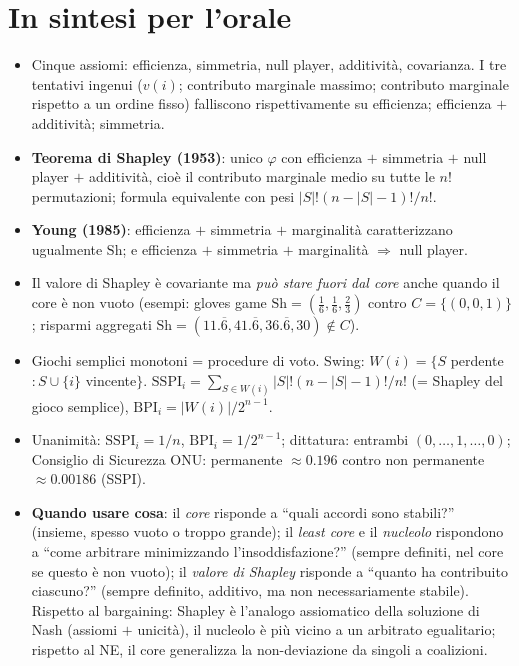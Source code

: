 \documentclass[12pt,a4paper,twoside]{book}
\theoremstyle{plain}
\theoremstyle{definition}
\newcommand{\Sh}{\mathrm{Sh}}
\begin{document}
\section*{In sintesi per l'orale}
\begin{itemize}
  \item Cinque assiomi: efficienza, simmetria, null player, additività,
        covarianza. I tre tentativi ingenui ($v(i)$; contributo marginale massimo;
        contributo marginale rispetto a un ordine fisso) falliscono
        rispettivamente su efficienza; efficienza $+$ additività; simmetria.
  \item \textbf{Teorema di Shapley (1953)}: unico $\varphi$ con efficienza $+$
        simmetria $+$ null player $+$ additività, cioè il contributo marginale
        medio su tutte le $n!$ permutazioni; formula equivalente con pesi
        $|S|!(n-|S|-1)!/n!$.
  \item \textbf{Young (1985)}: efficienza $+$ simmetria $+$ marginalità
        caratterizzano ugualmente $\Sh$; e efficienza $+$ simmetria $+$
        marginalità $\Rightarrow$ null player.
  \item Il valore di Shapley è covariante ma \emph{può stare fuori dal core}
        anche quando il core è non vuoto (esempi: gloves game
        $\Sh=(\tfrac16,\tfrac16,\tfrac23)$ contro $C=\{(0,0,1)\}$; risparmi
        aggregati $\Sh=(11.\overline6,41.\overline6,36.\overline6,30)\notin C$).
  \item Giochi semplici monotoni = procedure di voto. Swing:
        $W(i)=\{S$ perdente$:S\cup\{i\}$ vincente$\}$.
        $\mathrm{SSPI}_i=\sum_{S\in W(i)}|S|!(n-|S|-1)!/n!$ (= Shapley del gioco
        semplice), $\mathrm{BPI}_i=|W(i)|/2^{n-1}$.
  \item Unanimità: $\mathrm{SSPI}_i=1/n$, $\mathrm{BPI}_i=1/2^{n-1}$; dittatura:
        entrambi $(0,\dots,1,\dots,0)$; Consiglio di Sicurezza ONU: permanente
        $\approx 0.196$ contro non permanente $\approx 0.00186$ (SSPI).
  \item \textbf{Quando usare cosa}: il \emph{core} risponde a ``quali accordi sono
        stabili?'' (insieme, spesso vuoto o troppo grande); il \emph{least core}
        e il \emph{nucleolo} rispondono a ``come arbitrare minimizzando
        l'insoddisfazione?'' (sempre definiti, nel core se questo è non vuoto);
        il \emph{valore di Shapley} risponde a ``quanto ha contribuito ciascuno?''
        (sempre definito, additivo, ma non necessariamente stabile). Rispetto al
        bargaining: Shapley è l'analogo assiomatico della soluzione di Nash
        (assiomi $+$ unicità), il nucleolo è più vicino a un arbitrato
        egualitario; rispetto al NE, il core generalizza la non-deviazione da
        singoli a coalizioni.
\end{itemize}
\end{document}
